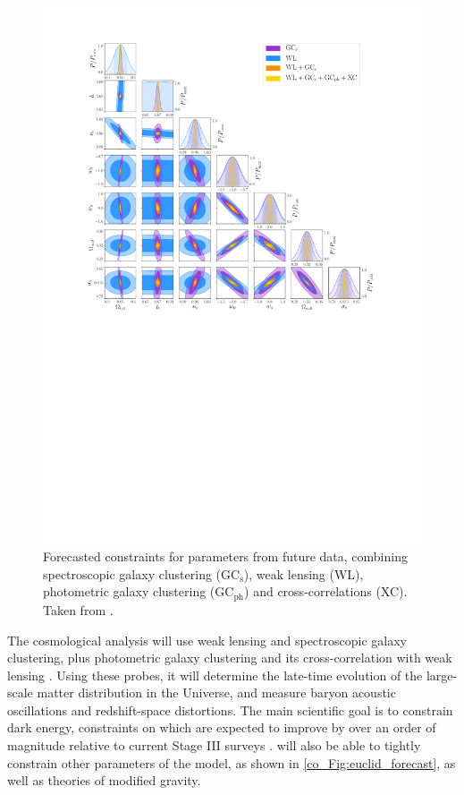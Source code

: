 \begin{figure}
\centering
\includegraphics[width=\textwidth]{euclid_forecast}
\caption{Forecasted constraints for \wcdm{} parameters from future \Euclid{} data, combining spectroscopic galaxy clustering (GC${}_\text{s}$), weak lensing (WL), photometric galaxy clustering (GC${}_\text{ph}$) and cross-correlations (XC). Taken from \citet{Blanchard2020}.}
\label{co_Fig:euclid_forecast}
\end{figure}

The \Euclid{} cosmological analysis will use weak lensing and spectroscopic galaxy clustering, plus photometric galaxy clustering and its cross-correlation with weak lensing \citep{Blanchard2020}. Using these probes, it will determine the late-time evolution of the large-scale matter distribution in the Universe, and measure baryon acoustic oscillations and redshift-space distortions. The main scientific goal is to constrain dark energy, constraints on which are expected to improve by over an order of magnitude relative to current Stage III surveys \citep{Harrison2016}. \Euclid{} will also be able to tightly constrain other parameters of the \wcdm{} model, as shown in \autoref{co_Fig:euclid_forecast}, as well as theories of modified gravity.

